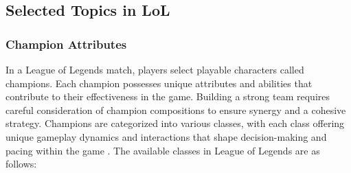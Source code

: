 \documentclass[11pt,a4paper,oneside]{report}
\begin{document}
\subsection{Selected Topics in LoL}
\label{sec:game_topics}
\subsubsection{Champion Attributes}

In a League of Legends match, players select playable characters called champions. Each champion possesses unique attributes and abilities that contribute to their effectiveness in the game. Building a strong team requires careful consideration of champion compositions to ensure synergy and a cohesive strategy. Champions are categorized into various classes, with each class offering unique gameplay dynamics and interactions that shape decision-making and pacing within the game \cite{league-wiki-champ-class}. The available classes in League of Legends are as follows:
\end{document}
